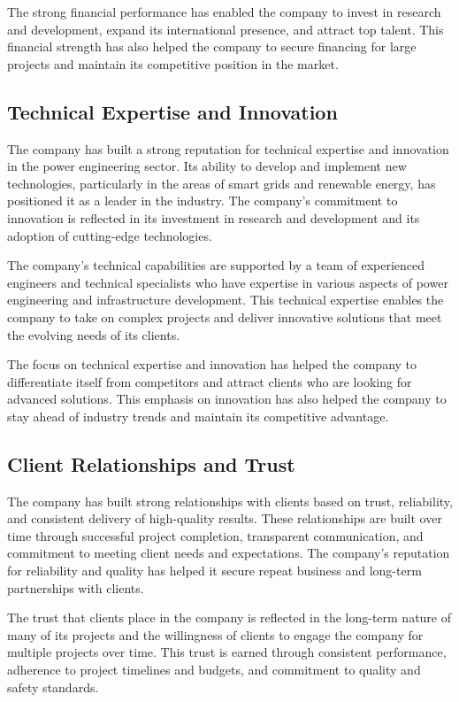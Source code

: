 The strong financial performance has enabled the company to invest in research and development, expand its international presence, and attract top talent. This financial strength has also helped the company to secure financing for large projects and maintain its competitive position in the market.

\subsection{Technical Expertise and Innovation}
The company has built a strong reputation for technical expertise and innovation in the power engineering sector. Its ability to develop and implement new technologies, particularly in the areas of smart grids and renewable energy, has positioned it as a leader in the industry. The company's commitment to innovation is reflected in its investment in research and development and its adoption of cutting-edge technologies.

The company's technical capabilities are supported by a team of experienced engineers and technical specialists who have expertise in various aspects of power engineering and infrastructure development. This technical expertise enables the company to take on complex projects and deliver innovative solutions that meet the evolving needs of its clients.

The focus on technical expertise and innovation has helped the company to differentiate itself from competitors and attract clients who are looking for advanced solutions. This emphasis on innovation has also helped the company to stay ahead of industry trends and maintain its competitive advantage.

\subsection{Client Relationships and Trust}
The company has built strong relationships with clients based on trust, reliability, and consistent delivery of high-quality results. These relationships are built over time through successful project completion, transparent communication, and commitment to meeting client needs and expectations. The company's reputation for reliability and quality has helped it secure repeat business and long-term partnerships with clients.

The trust that clients place in the company is reflected in the long-term nature of many of its projects and the willingness of clients to engage the company for multiple projects over time. This trust is earned through consistent performance, adherence to project timelines and budgets, and commitment to quality and safety standards.

